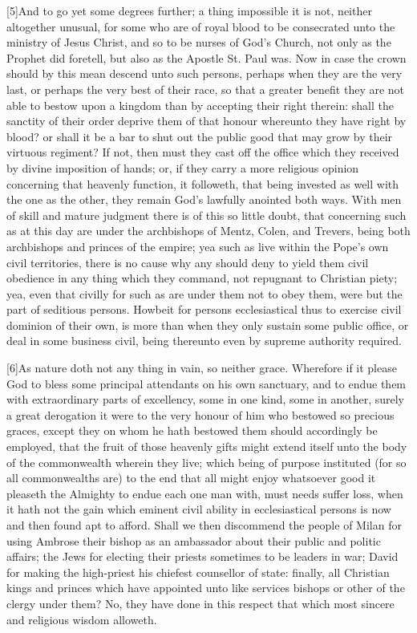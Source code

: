 [5]And to go yet some degrees further; a thing impossible it is not, neither altogether unusual, for some who are of royal blood to be consecrated unto the ministry of Jesus Christ, and so to be nurses of God’s Church, not only as the Prophet did foretell, but also as the Apostle St. Paul was. Now in case the crown should by this mean descend unto such persons, perhaps when they are the very last, or perhaps the very best of their race, so that a greater benefit they are not able to bestow upon a kingdom than by accepting  their right therein: shall the sanctity of their order deprive them of that honour whereunto they have right by blood? or shall it be a bar to shut out the public good that may grow by their virtuous regiment? If not, then must they cast off the office which they received by divine imposition of hands; or, if they carry a more religious opinion concerning that heavenly function, it followeth, that being invested as well with the one as the other, they remain God’s lawfully anointed both ways. With men of skill and mature judgment there is of this so little doubt, that concerning such as at this day are under the archbishops of Mentz, Colen, and Trevers, being both archbishops and princes of the empire; yea such as live within the Pope’s own civil territories, there is no cause why any should deny to yield them civil obedience in any thing which they command, not repugnant to Christian piety; yea, even that civilly for such as are under them not to obey them, were but the part of seditious persons. Howbeit for persons ecclesiastical  thus to exercise civil dominion of their own, is more than when they only sustain some public office, or deal in some business civil, being thereunto even by supreme authority required.

[6]As nature doth not any thing in vain, so neither grace. Wherefore if it please God to bless some principal attendants on his own sanctuary, and to endue them with extraordinary parts of excellency, some in one kind, some in another, surely a great derogation it were to the very honour of him who bestowed so precious graces, except they on whom he hath bestowed them should accordingly be employed, that the fruit of those heavenly gifts might extend itself unto the body of the commonwealth wherein they live; which being of purpose instituted (for so all commonwealths are) to the end that all might enjoy whatsoever good it pleaseth the Almighty to endue each one man with, must needs suffer loss, when it hath not the gain which eminent civil ability in ecclesiastical persons is now and then found apt to afford. Shall we then discommend the people of Milan for using Ambrose their bishop as an ambassador about their public and politic affairs; the Jews for electing their priests sometimes to be leaders in war; David for making the high-priest his chiefest counsellor of state: finally, all Christian kings and princes which have appointed unto like services bishops or other of the clergy under them? No, they have done in this respect that which most sincere and religious wisdom alloweth.

